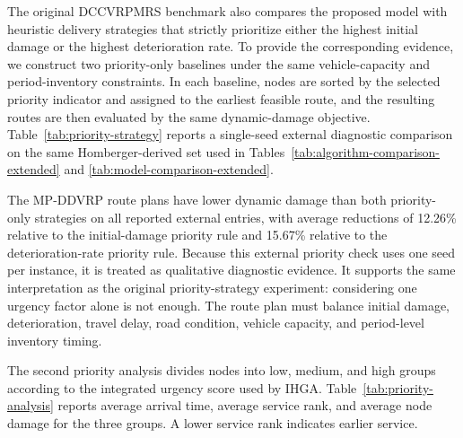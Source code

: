 ﻿\documentclass[preprint,12pt,authoryear]{elsarticle}
\begin{document}
The original DCCVRPMRS benchmark also compares the proposed model with heuristic delivery strategies that strictly prioritize either the highest initial damage or the highest deterioration rate. To provide the corresponding evidence, we construct two priority-only baselines under the same vehicle-capacity and period-inventory constraints. In each baseline, nodes are sorted by the selected priority indicator and assigned to the earliest feasible route, and the resulting routes are then evaluated by the same dynamic-damage objective. Table~\ref{tab:priority-strategy} reports a single-seed external diagnostic comparison on the same Homberger-derived set used in Tables~\ref{tab:algorithm-comparison-extended} and \ref{tab:model-comparison-extended}.

\begin{table}[H]
\centering
\caption{Comparison with priority-only heuristic delivery strategies.}
\label{tab:priority-strategy}
\scriptsize
{}
\end{table}

The MP-DDVRP route plans have lower dynamic damage than both priority-only strategies on all reported external entries, with average reductions of 12.26\% relative to the initial-damage priority rule and 15.67\% relative to the deterioration-rate priority rule. Because this external priority check uses one seed per instance, it is treated as qualitative diagnostic evidence. It supports the same interpretation as the original priority-strategy experiment: considering one urgency factor alone is not enough. The route plan must balance initial damage, deterioration, travel delay, road condition, vehicle capacity, and period-level inventory timing.

The second priority analysis divides nodes into low, medium, and high groups according to the integrated urgency score used by IHGA. Table~\ref{tab:priority-analysis} reports average arrival time, average service rank, and average node damage for the three groups. A lower service rank indicates earlier service.
\end{document}
